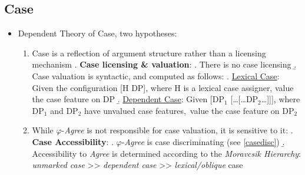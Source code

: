 \documentclass[letterpaper,10pt]{handout_nick}
\begin{document}
\subsection{Case}
\begin{itemize}
\item Dependent Theory of Case, two hypotheses:
\begin{enumerate} 
\item Case is a reflection of argument structure rather than a licensing mechanism
\ex. \textbf{Case licensing \& valuation}:
\a. There is no case licensing 
\b. Case valuation is syntactic, and computed as follows:
\a. \underline{Lexical Case}: Given the configuration [H DP], where H is a lexical case assigner, value the case feature on DP
\b. \underline{Dependent Case}: Given [DP$_1$ [\ldots[\ldots DP$_2$\ldots]]], where DP$_1$ and DP$_2$ have unvalued case features,\footnotemark\ value the case feature on DP$_2$

\item While $\varphi$-\emph{Agree} is not responsible for case valuation, it is sensitive to it:
\ex. \textbf{Case Accessibility}:
\a. $\varphi$-\emph{Agree} is case discriminating (see \ref{casedisc}) 
\b. Accessibility to \emph{Agree} is determined according to the \emph{Moravcsik Hierarchy}:\\
\emph{unmarked case} >> \emph{dependent case} >> \emph{lexical/oblique} case


\end{enumerate}
\end{itemize}
\end{document}
